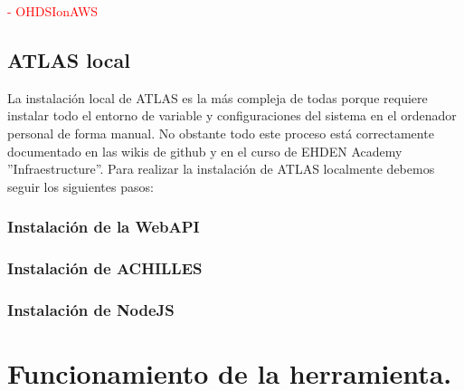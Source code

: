 \documentclass{article}
\begin{document}
\textcolor{red}{- OHDSIonAWS}


\newpage
\subsection{ATLAS local }

La instalación local de ATLAS es la más compleja de todas porque requiere instalar todo el entorno de variable y configuraciones del sistema en el ordenador personal de forma manual. No obstante todo este proceso está correctamente documentado en las wikis de github \cite{AtlasSetup} y en el curso de EHDEN Academy \cite{EHDENAcademy} ''Infraestructure''. Para realizar la instalación de ATLAS localmente debemos seguir los siguientes pasos:

\subsubsection{Instalación de la WebAPI}

\subsubsection{Instalación de ACHILLES}

\subsubsection{Instalación de NodeJS}





\newpage
\section{Funcionamiento de la herramienta.}




\newpage


\end{document}
